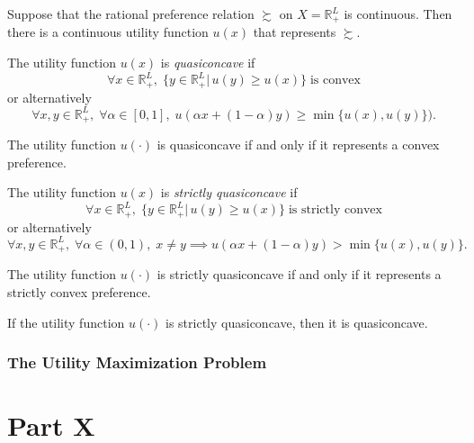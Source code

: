 \documentclass[11pt,fleqn]{book} %
\begin{document}
\begin{theorem}
	Suppose that the rational preference relation $\succsim$ on $X=\mathbb{R}_+^L$ is continuous.
	Then there is a continuous utility function $u(x)$ that represents $\succsim$.
\end{theorem}

\begin{definition}[Quasiconcavity]
	The utility function $u(x)$ is \emph{quasiconcave} if
	\[
	\forall x\in\mathbb{R}_+^L,\;\{y\in\mathbb{R}_+^L|\,u(y)\geqslant u(x)\}\;\text{is convex}
	\]
	or alternatively
	\[
	\forall x,y\in\mathbb{R}_+^L,\;\forall \alpha\in[0,1],\;u(\alpha x+(1-\alpha)y)\geqslant \min\{u(x),u(y)\}).
	\]
\end{definition}

\begin{proposition}
	The utility function $u(\cdot)$ is quasiconcave if and only if it represents a convex preference.
\end{proposition}


\begin{definition}
	The utility function $u(x)$ is \emph{strictly quasiconcave} if
	\[
	\forall x\in\mathbb{R}_+^L,\;\{y\in\mathbb{R}_+^L|\,u(y)\geqslant u(x)\}\;\text{is strictly convex}
	\]
	or alternatively
	\[
	\forall x,y\in\mathbb{R}_+^L,\;\forall \alpha\in(0,1),\;x\ne y\implies u(\alpha x+(1-\alpha)y)>\min\{u(x),u(y)\}.
	\]
\end{definition}

\begin{proposition}
	The utility function $u(\cdot)$ is strictly quasiconcave if and only if it represents a strictly convex preference.
\end{proposition}

\begin{proposition}
	If the utility function $u(\cdot)$ is strictly quasiconcave, then it is quasiconcave.
\end{proposition}


\section{The Utility Maximization Problem}


\part{Part X}

\end{document}
